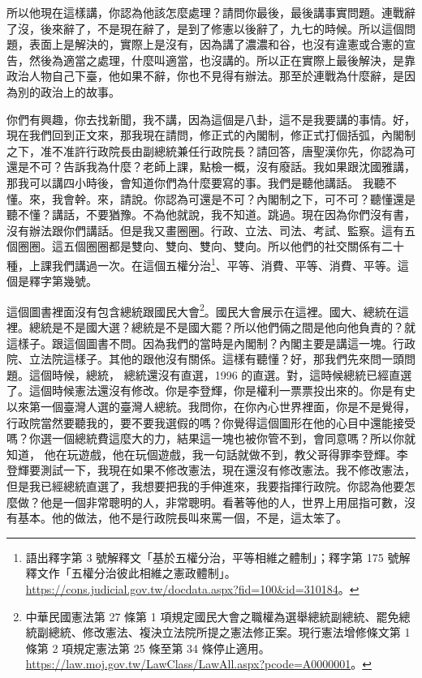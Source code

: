 \hypertarget{c08:cue:78}{}所以他現在這樣講，你認為他該怎麼處理？請問你最後，最後講事實問題。連戰辭了沒，後來辭了，不是現在辭了，是到了修憲以後辭了，九七的時候。所以這個問題，表面上是解決的，實際上是沒有，因為講了濃濃和谷，也沒有違憲或合憲的宣告，然後為適當之處理，什麼叫適當，也沒講的。所以正在實際上最後解決，是靠政治人物自己下臺，他如果不辭，你也不見得有辦法。那至於連戰為什麼辭，是因為別的政治上的故事。

\hypertarget{c08:cue:79}{}你們有興趣，你去找新聞，我不講，因為這個是八卦，這不是我要講的事情。好，現在我們回到正文來，那我現在請問，修正式的內閣制，修正式打個括弧，內閣制之下，准不准許行政院長由副總統兼任行政院長？請回答，唐聖漢你先，你認為可還是不可？告訴我為什麼？老師上課，點檢一概，沒有廢話。我如果跟沈國雅講，那我可以講四小時後，會知道你們為什麼要寫的事。我們是聽他講話。
\hypertarget{c08:cue:80}{}我聽不懂。來，我會幹。來，請說。你認為可還是不可？內閣制之下，可不可？聽懂還是聽不懂？講話，不要猶豫。不為他就說，我不知道。跳過。現在因為你們沒有書，沒有辦法跟你們講話。但是我又畫圈圈。行政、立法、司法、考試、監察。這有五個圈圈。這五個圈圈都是雙向、雙向、雙向、雙向。所以他們的社交關係有二十種，上課我們講過一次。在這個五權分治\footnote{語出釋字第 3 號解釋文「基於五權分治，平等相維之體制」；釋字第 175 號解釋文作「五權分治彼此相維之憲政體制」。\url{https://cons.judicial.gov.tw/docdata.aspx?fid=100&id=310184}。}、平等、消費、平等、消費、平等。這個是釋字第幾號。

\hypertarget{c08:cue:81}{}這個圖書裡面沒有包含總統跟國民大會\footnote{中華民國憲法第 27 條第 1 項規定國民大會之職權為選舉總統副總統、罷免總統副總統、修改憲法、複決立法院所提之憲法修正案。現行憲法增修條文第 1 條第 2 項規定憲法第 25 條至第 34 條停止適用。\url{https://law.moj.gov.tw/LawClass/LawAll.aspx?pcode=A0000001}。}。國民大會展示在這裡。國大、總統在這裡。總統是不是國大選？總統是不是國大罷？所以他們倆之間是他向他負責的？就這樣子。跟這個圖書不問。因為我們的當時是內閣制？內閣主要是講這一塊。行政院、立法院這樣子。其他的跟他沒有關係。這樣有聽懂？好，那我們先來問一頭問題。這個時候，總統，
\hypertarget{c08:cue:82}{}總統還沒有直選，1996 的直選。對，這時候總統已經直選了。這個時候憲法還沒有修改。你是李登輝，你是權利一票票投出來的。你是有史以來第一個臺灣人選的臺灣人總統。我問你，在你內心世界裡面，你是不是覺得，行政院當然要聽我的，要不要我選假的嗎？你覺得這個圖形在他的心目中還能接受嗎？你選一個總統費這麼大的力，結果這一塊也被你管不到，會同意嗎？所以你就知道，
\hypertarget{c08:cue:83}{}他在玩遊戲，他在玩個遊戲，我一句話就做不到，教父哥得罪李登輝。李登輝要測試一下，我現在如果不修改憲法，現在還沒有修改憲法。我不修改憲法，但是我已經總統直選了，我想要把我的手伸進來，我要指揮行政院。你認為他要怎麼做？他是一個非常聰明的人，非常聰明。看著等他的人，世界上用屈指可數，沒有基本。他的做法，他不是行政院長叫來罵一個，不是，這太笨了。

